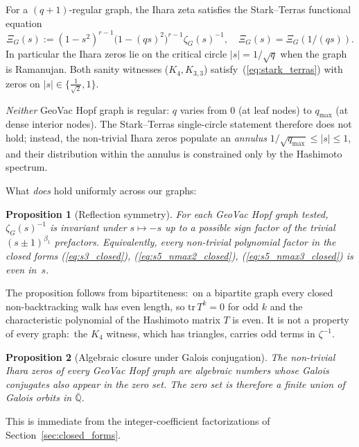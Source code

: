 \documentclass[11pt]{article}
\newtheorem{proposition}{Proposition}
\begin{document}
For a $(q{+}1)$-regular graph, the Ihara zeta satisfies the
Stark--Terras functional equation~\cite{stark1996,terras2010}
\begin{equation}
\Xi_G(s) := (1 - s^2)^{r-1}\bigl(1 - (qs)^2\bigr)^{r-1}\zeta_G(s)^{-1},
\quad \Xi_G(s) = \Xi_G(1/(qs)).
\label{eq:stark_terras}
\end{equation}
In particular the Ihara zeros lie on the critical circle $|s|=1/\sqrt{q}$
when the graph is Ramanujan.  Both sanity witnesses ($K_4, K_{3,3}$)
satisfy~(\ref{eq:stark_terras}) with zeros on $|s|\in\{\tfrac{1}{\sqrt{2}},
1\}$.

\emph{Neither} GeoVac Hopf graph is regular: $q$ varies from 0 (at
leaf nodes) to $q_{\max}$ (at dense interior nodes).  The Stark--Terras
single-circle statement therefore does not hold; instead, the
non-trivial Ihara zeros populate an \emph{annulus}
$1/\sqrt{q_{\max}}\le|s|\le 1$, and their distribution within the
annulus is constrained only by the Hashimoto spectrum.

What \emph{does} hold uniformly across our graphs:

\begin{proposition}[Reflection symmetry]
\label{prop:reflection}
For each GeoVac Hopf graph tested, $\zeta_G(s)^{-1}$ is invariant
under $s\mapsto -s$ up to a possible sign factor of the trivial
$(s\pm 1)^{\beta_1}$ prefactors.  Equivalently, every non-trivial
polynomial factor in the closed forms
(\ref{eq:s3_closed}), (\ref{eq:s5_nmax2_closed}),
(\ref{eq:s5_nmax3_closed}) is even in~$s$.
\end{proposition}

The proposition follows from bipartiteness:\ on a bipartite graph
every closed non-backtracking walk has even length, so
$\mathrm{tr}\,T^{k} = 0$ for odd $k$ and the characteristic polynomial
of the Hashimoto matrix $T$ is even.  It is not a property of every
graph:\ the $K_4$ witness, which has triangles, carries odd terms in
$\zeta^{-1}$.

\begin{proposition}[Algebraic closure under Galois conjugation]
\label{prop:galois}
The non-trivial Ihara zeros of every GeoVac Hopf graph are algebraic
numbers whose Galois conjugates also appear in the zero set.  The
zero set is therefore a finite union of Galois orbits in
$\bar{\mathbb{Q}}$.
\end{proposition}

This is immediate from the integer-coefficient factorizations of
Section~\ref{sec:closed_forms}.
\end{document}
